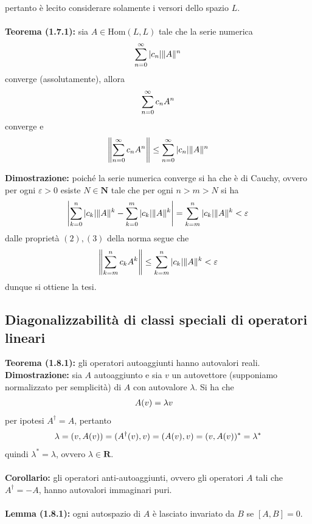 \documentclass{article}
\begin{document}
pertanto è lecito considerare solamente i versori dello spazio $L$. \\ \\
\textbf{Teorema (1.7.1):} sia $A \in \mathrm{Hom}(L, L)$ tale che la serie numerica
\begin{gather}
    \sum_{n = 0}^\infty |c_n|\|A\|^n \notag
\end{gather}
converge (assolutamente), allora
\begin{gather}
    \sum_{n = 0}^\infty c_nA^n \notag
\end{gather}
converge e
\begin{gather}
    \left\|\sum_{n = 0}^\infty c_nA^n\right\| \leq \sum_{n = 0}^\infty |c_n|\|A\|^n \notag
\end{gather}

\textbf{Dimostrazione:} poiché la serie numerica converge si ha che è di Cauchy, ovvero per ogni $\varepsilon > 0$ esiste $N \in \mathbf{N}$ tale che per ogni $n > m > N$ si ha
\begin{gather}
    \left|\sum_{k = 0}^n |c_k|\|A\|^k - \sum_{k = 0}^m |c_k|\|A\|^k\right| = \sum_{k = m}^n |c_k|\|A\|^k < \varepsilon \notag
\end{gather}
dalle proprietà $(2), (3)$ della norma segue che
\begin{gather}
    \left\|\sum_{k = m}^n c_kA^k\right\| \leq \sum_{k = m}^n |c_k|\|A\|^k < \varepsilon \notag
\end{gather}
dunque si ottiene la tesi.

\newpage
\subsection{Diagonalizzabilità di classi speciali di operatori lineari}
\textbf{Teorema (1.8.1):} gli operatori autoaggiunti hanno autovalori reali. \\

\textbf{Dimostrazione:} sia $A$ autoaggiunto e sia $v$ un autovettore (supponiamo normalizzato per semplicità) di $A$ con autovalore $\lambda$. Si ha che
\begin{align}
    A(v) &= \lambda v \notag
\end{align}
per ipotesi $A^\dagger = A$, pertanto
\begin{align}
    \lambda = (v, A(v)) = (A^\dagger(v), v) = (A(v), v) = (v, A(v))^* = \lambda^* \notag
\end{align}
quindi $\lambda^* = \lambda$, ovvero $\lambda \in \mathbf{R}$. \\ \\
\textbf{Corollario:} gli operatori anti-autoaggiunti, ovvero gli operatori $A$ tali che $A^\dagger = -A$, hanno autovalori immaginari puri. \\ \\
\textbf{Lemma (1.8.1):} ogni autospazio di $A$ è lasciato invariato da $B$ se $[A, B] = 0$. \\
\end{document}
